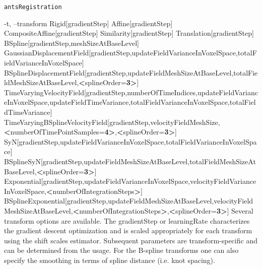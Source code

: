 \documentclass[ignorenonframetext,]{beamer}
\newenvironment{Shaded}{\begin{snugshade}}{\end{snugshade}}
\newcommand{\OperatorTok}[1]{\textcolor[rgb]{0.81,0.36,0.00}{\textbf{#1}}}
\newcommand{\ExtensionTok}[1]{#1}
\newcommand{\NormalTok}[1]{#1}
\begin{document}
\begin{frame}[fragile]{\texttt{antsRegistration}}
\begin{Shaded}
\begin{Highlighting}[]
     \ExtensionTok{-t}\NormalTok{, --transform Rigid[gradientStep]}
                     \ExtensionTok{Affine}\NormalTok{[gradientStep]}
                     \ExtensionTok{CompositeAffine}\NormalTok{[gradientStep]}
                     \ExtensionTok{Similarity}\NormalTok{[gradientStep]}
                     \ExtensionTok{Translation}\NormalTok{[gradientStep]}
                     \ExtensionTok{BSpline}\NormalTok{[gradientStep,meshSizeAtBaseLevel]}
                     \ExtensionTok{GaussianDisplacementField}\NormalTok{[gradientStep,updateFieldVarianceInVoxelSpace,totalFieldVarianceInVoxelSpace]}
                     \ExtensionTok{BSplineDisplacementField}\NormalTok{[gradientStep,updateFieldMeshSizeAtBaseLevel,totalFieldMeshSizeAtBaseLevel,}\OperatorTok{<}\NormalTok{splineOrder=}\OperatorTok{3>}\NormalTok{]}
                     \ExtensionTok{TimeVaryingVelocityField}\NormalTok{[gradientStep,numberOfTimeIndices,updateFieldVarianceInVoxelSpace,updateFieldTimeVariance,totalFieldVarianceInVoxelSpace,totalFieldTimeVariance]}
                     \ExtensionTok{TimeVaryingBSplineVelocityField}\NormalTok{[gradientStep,velocityFieldMeshSize,}\OperatorTok{<}\NormalTok{numberOfTimePointSamples=}\OperatorTok{4>}\NormalTok{,}\OperatorTok{<}\NormalTok{splineOrder=}\OperatorTok{3>}\NormalTok{]}
                     \ExtensionTok{SyN}\NormalTok{[gradientStep,updateFieldVarianceInVoxelSpace,totalFieldVarianceInVoxelSpace]}
                     \ExtensionTok{BSplineSyN}\NormalTok{[gradientStep,updateFieldMeshSizeAtBaseLevel,totalFieldMeshSizeAtBaseLevel,}\OperatorTok{<}\NormalTok{splineOrder=}\OperatorTok{3>}\NormalTok{]}
                     \ExtensionTok{Exponential}\NormalTok{[gradientStep,updateFieldVarianceInVoxelSpace,velocityFieldVarianceInVoxelSpace,}\OperatorTok{<}\NormalTok{numberOfIntegrationSteps}\OperatorTok{>}\NormalTok{]}
                     \ExtensionTok{BSplineExponential}\NormalTok{[gradientStep,updateFieldMeshSizeAtBaseLevel,velocityFieldMeshSizeAtBaseLevel,}\OperatorTok{<}\NormalTok{numberOfIntegrationSteps}\OperatorTok{>}\NormalTok{,}\OperatorTok{<}\NormalTok{splineOrder=}\OperatorTok{3>}\NormalTok{]}
          \ExtensionTok{Several}\NormalTok{ transform options are available. The gradientStep or learningRate}
          \ExtensionTok{characterizes}\NormalTok{ the gradient descent optimization and is scaled appropriately for}
          \ExtensionTok{each}\NormalTok{ transform using the shift scales estimator. Subsequent parameters are}
          \ExtensionTok{transform-specific}\NormalTok{ and can be determined from the usage. For the B-spline}
          \ExtensionTok{transforms}\NormalTok{ one can also specify the smoothing in terms of spline distance (i.e.}
          \ExtensionTok{knot}\NormalTok{ spacing)}\ExtensionTok{.}


\end{Highlighting}
\end{Shaded}
\end{frame}
\end{document}
